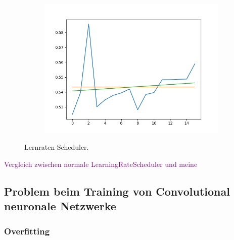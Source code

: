 \documentclass[12pt,a4paper]{scrartcl}
\numberwithin{equation}{section}
\begin{document}
\begin{figure}[h]
\begin{subfigure}{.3\textwidth}
		\includegraphics[width=\textwidth]{lr_schedu_Falsch}
	\end{subfigure}
	\caption{Lernraten-Scheduler.}
	\label{fig:Lernrate_scheduler}
\end{figure}

\textcolor{purple}{Vergleich zwischen normale LearningRateScheduler und meine}




\subsection{Problem beim Training von  Convolutional   neuronale Netzwerke}
\subsubsection{Overfitting }\label{Overfitting}
\end{document}
